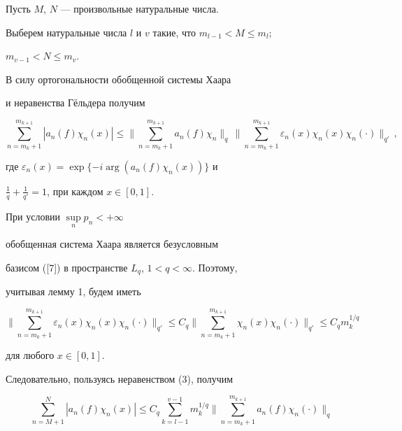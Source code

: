 \begin{pf} 


Пусть $M$, $N$ --- произвольные натуральные числа. 


Выберем натуральные числа $l$ и $v$ такие, что $m_{l-1}<M\le m_l$; 


$m_{v-1}<N\le m_v$. 


В силу ортогональности обобщенной системы Хаара 


и неравенства Г\"ельдера получим 


\begin{equation} 


\sum^{m_{k+1}}_{n=m_k+1}|a_n(f)\chi_n(x)|\le\bigg\| 


\sum^{m_{k+1}}_{n=m_k+1}a_n(f)\chi_n\bigg\|_q\, 


\bigg\|\sum^{m_{k+1}}_{n=m_k+1}\varepsilon_n(x) 


\chi_n(x)\chi_n(\cdot)\bigg\|_{q'}\, , 


\end{equation} 


где $\varepsilon_n(x)=\exp\{-i\arg(a_n(f)\chi_n(x))\}$ и 


$\frac{1}{q}+\frac{1}{q'}=1$, при каждом $x\in[0,1]$. 


 


При условии $\sup\limits_n p_n<+\infty$ 


обобщенная система Хаара является безусловным 


базисом ([7]) в пространстве $L_q$, $1<q<\infty$. Поэтому, 


учитывая лемму 1, будем иметь 


$$ 


\bigg\|\sum^{m_{k+1}}_{n=m_k+1}\varepsilon_n(x)\chi_n(x) 


\chi_n(\cdot)\bigg\|_{q'}\le C_q\bigg\| 


\sum^{m_{k+1}}_{n=m_k+1}\chi_n(x)\chi_n(\cdot)\bigg\|_{q'} 


\le C_q m^{1/q}_k 


$$ 


для любого $x\in[0,1]$. 


Следовательно, пользуясь неравенством (3), получим 


\begin{equation}  


\sum^N_{n=M+1}|a_n(f)\chi_n(x)|\le C_q\sum^{v-1}_{k=l-1} 


m^{1/q}_k\bigg\|\sum^{m_{k+1}}_{n=m_k+1} 


a_n(f)\chi_n(\cdot)\bigg\|_q 



\end{equation}
\end{pf}
